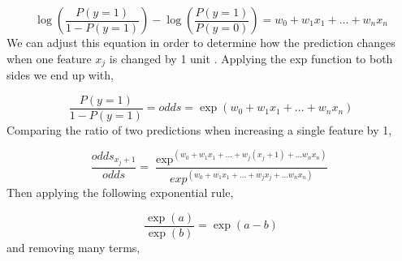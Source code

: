 \begin{equation}
    \log \left( \frac{P(y=1)}{1 - P(y=1)} \right) - \log \left( \frac{P(y=1)}{P(y=0)} \right) = w_{0} + w_{1}x_{1} + ... + w_{n}x_{n}
\end{equation}
We can adjust this equation in order to determine how the prediction changes when one feature $x_{j}$ is changed by 1 unit \cite{molnar2019}. Applying the exp function to both sides we end up with,

\begin{equation}
     \frac{P(y=1)}{1 - P(y=1)} = odds = \exp( w_{0} + w_{1}x_{1} + ... + w_{n}x_{n})
\end{equation}
Comparing the ratio of two predictions when increasing a single feature by 1,

\begin{equation}
    \frac{odds_{x_{j}+1}}{odds} = \frac{\exp^( w_{0} + w_{1}x_{1} + ... + w_{j}(x_{j} + 1) + ... w_{n}x_{n})}{exp^( w_{0} + w_{1}x_{1} + ... + w_{j}x_{j} + ... w_{n}x_{n})}
\end{equation}
Then applying the following exponential rule,

\begin{equation}
    \frac{\exp(a)}{\exp(b)} = \exp(a - b)
\end{equation}
and removing many terms,

